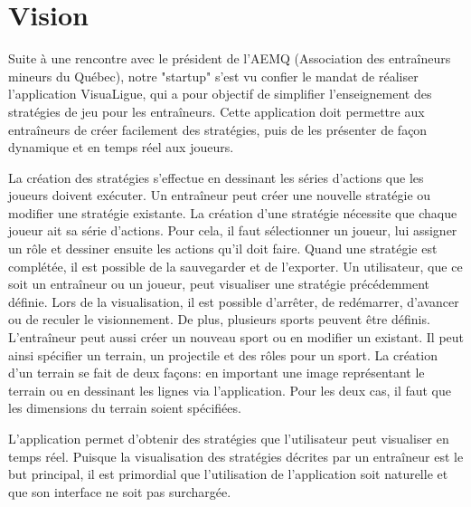 
\chapter{Vision}
\label{s:vision}

Suite à une rencontre avec le président de l'AEMQ (Association des entraîneurs mineurs du Québec), notre "startup" s'est vu confier le mandat de réaliser l'application VisuaLigue, qui a pour objectif de simplifier l'enseignement des stratégies de jeu pour les entraîneurs.
Cette application doit permettre aux entraîneurs de créer facilement des stratégies, puis de les présenter de façon dynamique et en temps réel aux joueurs.

La cr\'eation des strat\'egies s'effectue en dessinant les s\'eries d'actions que les joueurs doivent ex\'ecuter.
Un entraîneur peut créer une nouvelle stratégie ou modifier une stratégie existante.
La création d'une stratégie nécessite que chaque joueur ait sa série d'actions.
Pour cela, il faut s\'electionner un joueur, lui assigner un r\^ole et dessiner ensuite les actions qu'il doit faire.
Quand une strat\'egie est compl\'et\'ee, il est possible de la sauvegarder et de l'exporter.
Un utilisateur, que ce soit un entraîneur ou un joueur, peut visualiser une strat\'egie pr\'ec\'edemment d\'efinie.
Lors de la visualisation, il est possible d'arr\^eter, de red\'emarrer, d'avancer ou de reculer le visionnement.
De plus, plusieurs sports peuvent \^etre d\'efinis.
L'entraîneur peut aussi créer un nouveau sport ou en modifier un existant.
Il peut ainsi sp\'ecifier un terrain, un projectile et des r\^oles pour un sport.
La création d'un terrain se fait de deux façons: en important une image représentant le terrain ou en dessinant les lignes via l'application.
Pour les deux cas, il faut que les dimensions du terrain soient spécifiées.

L'application permet d'obtenir des strat\'egies que l'utilisateur peut visualiser en temps r\'eel.
Puisque la visualisation des stratégies décrites par un entraîneur est le but principal, il est primordial que l'utilisation de l'application soit naturelle et que son interface ne soit pas surchargée.
